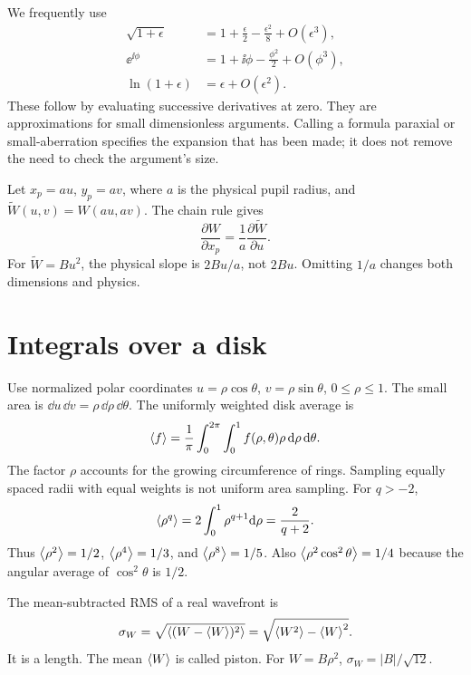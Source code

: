 We frequently use
\begin{align}
\sqrt{1+\epsilon}&=1+\frac{\epsilon}{2}
-\frac{\epsilon^2}{8}+O(\epsilon^3),\\
\ee^{\ii\phi}&=1+\ii\phi-\frac{\phi^2}{2}+O(\phi^3),\\
\ln(1+\epsilon)&=\epsilon+O(\epsilon^2).
\end{align}
These follow by evaluating successive derivatives at zero. They are
approximations for small dimensionless arguments. Calling a formula
paraxial or small-aberration specifies the expansion that has been made;
it does not remove the need to check the argument's size.

Let $x_p=a u$, $y_p=a v$, where $a$ is the physical pupil radius,
and $\widetilde W(u,v)=W(au,av)$. The chain rule gives
\begin{equation}
\frac{\partial W}{\partial x_p}
=\frac{1}{a}\frac{\partial\widetilde W}{\partial u}.
\label{eq:chain}
\end{equation}
For $\widetilde W=B u^2$, the physical slope is $2Bu/a$,
not $2Bu$. Omitting $1/a$ changes both dimensions and physics.

\section{Integrals over a disk}
Use normalized polar coordinates $u=\rho\cos\theta$,
$v=\rho\sin\theta$, $0\leq\rho\leq1$.
The small area is $\dd u\,\dd v=\rho\,\dd\rho\,\dd\theta$.
The uniformly weighted disk average is
\begin{equation}
\left\langle f\right\rangle=\frac{1}{\pi}\int_0^{2\pi}\int_0^1
f(\rho,\theta)\rho\,\mathrm{d}\rho\,\mathrm{d}\theta.
\label{eq:diskaverage}
\end{equation}
The factor $\rho$ accounts for the growing circumference of rings.
Sampling equally spaced radii with equal weights is not uniform area sampling.
For $q>-2$,
\begin{equation}
\left\langle \rho^q\right\rangle=2\int_0^1\rho^{q+1}\mathrm{d}\rho=\frac{2}{q+2}.
\label{eq:diskpowers}
\end{equation}
Thus $\left\langle \rho^2\right\rangle=1/2$, $\left\langle \rho^4\right\rangle=1/3$, and
$\left\langle \rho^8\right\rangle=1/5$. Also $\left\langle \rho^2\cos^2\theta\right\rangle=1/4$
because the angular average of $\cos^2\theta$ is $1/2$.

The mean-subtracted RMS of a real wavefront is
\begin{equation}
\sigma_W=\sqrt{\left\langle (W-\left\langle W\right\rangle)^2\right\rangle}
=\sqrt{\left\langle W^2\right\rangle-\left\langle W\right\rangle^2}.
\label{eq:variance}
\end{equation}
It is a length. The mean $\left\langle W\right\rangle$ is called piston.
For $W=B\rho^2$, $\sigma_W=|B|/\sqrt{12}$.


